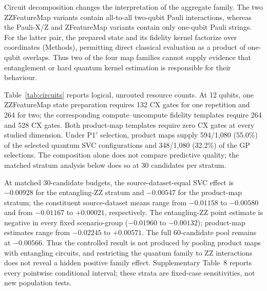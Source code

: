 \documentclass[referee,lineno,pdflatex,sn-nature]{sn-jnl}
\theoremstyle{thmstyleone}%
\theoremstyle{thmstyletwo}%
\theoremstyle{thmstylethree}%
\begin{document}
Circuit decomposition changes the interpretation of the aggregate family. The two ZZFeatureMap variants contain all-to-all two-qubit Pauli interactions, whereas the Pauli-X/Z and ZFeatureMap variants contain only one-qubit Pauli strings. For the latter pair, the prepared state and its fidelity kernel factorize over coordinates (Methods), permitting direct classical evaluation as a product of one-qubit overlaps. Thus two of the four map families cannot supply evidence that entanglement or hard quantum kernel estimation is responsible for their behaviour.

Table~\ref{tab:circuits} reports logical, unrouted resource counts. At 12 qubits, one ZZFeatureMap state preparation requires 132 CX gates for one repetition and 264 for two; the corresponding compute--uncompute fidelity templates require 264 and 528 CX gates. Both product-map templates require zero CX gates at every studied dimension. Under P1$'$ selection, product maps supply 594/1,080 (55.0\%) of the selected quantum SVC configurations and 348/1,080 (32.2\%) of the GP selections. The composition alone does not compare predictive quality; the matched stratum analysis below does so at 30 candidates per stratum.

At matched 30-candidate budgets, the source-dataset-equal SVC effect is $-0.00928$ for the entangling-ZZ stratum and $-0.00547$ for the product-map stratum; the constituent source-dataset means range from $-0.01158$ to $-0.00580$ and from $-0.01167$ to $+0.00021$, respectively. The entangling-ZZ point estimate is negative in every fixed scenario-group ($-0.01960$ to $-0.00132$); product-map estimates range from $-0.02245$ to $+0.00571$. The full 60-candidate pool remains at $-0.00566$. Thus the controlled result is not produced by pooling product maps with entangling circuits, and restricting the quantum family to ZZ interactions does not reveal a hidden positive family effect. Supplementary Table~8 reports every pointwise conditional interval; these strata are fixed-case sensitivities, not new population tests.
\end{document}
